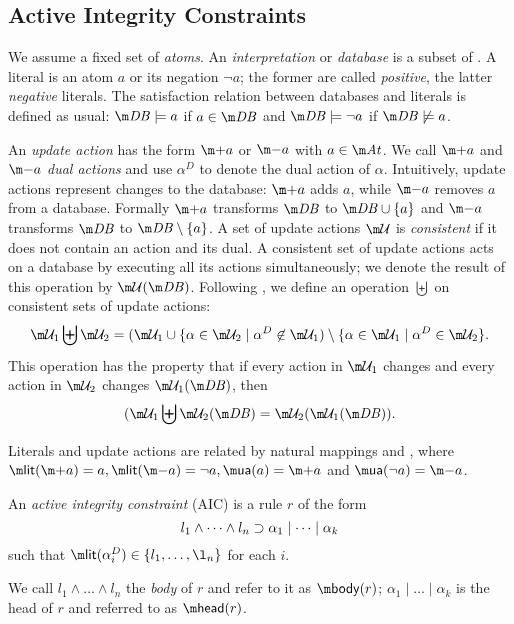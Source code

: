 \subsection{Active Integrity Constraints}
We assume a fixed set \atoms of \emph{atoms}. An \emph{interpretation} or \emph{database} is a subset of \atoms. A literal is an atom $a$ or its negation $\lnot a$; the former are called \emph{positive}, the latter \emph{negative} literals. 
The satisfaction relation between databases \db and literals is defined as usual: $\db \models a$ if $a\in\db$ and $\db \models \lnot a$ if $\db\not\models a$.

An \emph{update action} has the form $\add a$ or $\remove a$ with $a\in \atoms$. We call $\add a$ and $\remove a$ \emph{dual actions} and use $\alpha^D$ to denote the dual action of $\alpha$. 
Intuitively, update actions represent changes to the database: $\add a$ adds $a$, while $\remove a$ removes $a$ from a database. Formally $\add a$ transforms $\db$ to $\db\cup\{a\}$ and $\remove a $ transforms $\db$ to $\db\setminus\{a\}$. 
A set of update actions $\UU$ is \emph{consistent} if it does not contain an action and its dual. A consistent set of update actions \UU acts on a database \db by executing all its actions simultaneously; we denote the result of this operation by $\UU(\db)$. 
Following \cite{corr/Cruz-Filipe16}, we define an operation $\biguplus$ on consistent sets of update actions: 
\[\UU_1 \biguplus \UU_2 = (\UU_1 \cup \{\alpha \in \UU_2 \mid \alpha^D\not \in \UU_1) \setminus \{\alpha\in \UU_1 \mid \alpha^D\in \UU_2\}.\]
This operation has the property that if every action in $\UU_1$ changes \db and every action in $\UU_2$ changes $\UU_1(\db)$, then 
\[(\UU_1\biguplus \UU_2(\db) = \UU_2(\UU_1(\db)).\]

Literals and update actions are related by natural mappings \litof and \actof, where $\litof(\add a)= a, \litof(\remove a) = \lnot a, \actof(a) = \add a$ and $\actof(\lnot a) = \remove a$. 

\begin{definition}
 An \emph{active integrity constraint} (AIC) is a rule $r$ of the form
  \begin{equation} l_1\land \dots\land l_n\supset \alpha_1\mid\dots \mid \alpha_k \label{eq:aic}\end{equation}
  such that $\litof(\alpha_i^D) \in \{l_1,\dots,\l_n\}$ for each $i$.
  
  We call $l_1\land \dots \land l_n$ the \emph{body} of $r$ and refer to it as $\body(r)$; $\alpha_1\mid\dots \mid \alpha_k$ is the head of $r$ and referred to as $\head (r)$.
\end{definition}


